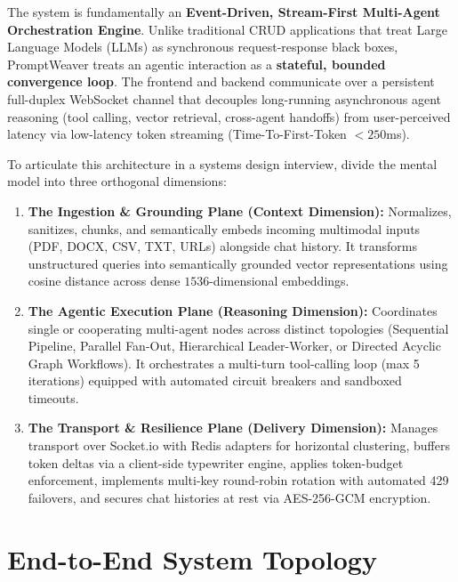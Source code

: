 \documentclass[10pt,a4paper]{article}
\begin{document}
\begin{mentalmodel}
The system is fundamentally an \textbf{Event-Driven, Stream-First Multi-Agent Orchestration Engine}. 
Unlike traditional CRUD applications that treat Large Language Models (LLMs) as synchronous request-response black boxes, PromptWeaver treats an agentic interaction as a \textbf{stateful, bounded convergence loop}. The frontend and backend communicate over a persistent full-duplex WebSocket channel that decouples long-running asynchronous agent reasoning (tool calling, vector retrieval, cross-agent handoffs) from user-perceived latency via low-latency token streaming (Time-To-First-Token $< 250$ms).
\end{mentalmodel}

\noindent To articulate this architecture in a systems design interview, divide the mental model into three orthogonal dimensions:
\begin{enumerate}[leftmargin=*]
    \item \textbf{The Ingestion \& Grounding Plane (Context Dimension):} Normalizes, sanitizes, chunks, and semantically embeds incoming multimodal inputs (PDF, DOCX, CSV, TXT, URLs) alongside chat history. It transforms unstructured queries into semantically grounded vector representations using cosine distance across dense $1536$-dimensional embeddings.
    \item \textbf{The Agentic Execution Plane (Reasoning Dimension):} Coordinates single or cooperating multi-agent nodes across distinct topologies (Sequential Pipeline, Parallel Fan-Out, Hierarchical Leader-Worker, or Directed Acyclic Graph Workflows). It orchestrates a multi-turn tool-calling loop (max 5 iterations) equipped with automated circuit breakers and sandboxed timeouts.
    \item \textbf{The Transport \& Resilience Plane (Delivery Dimension):} Manages transport over Socket.io with Redis adapters for horizontal clustering, buffers token deltas via a client-side typewriter engine, applies token-budget enforcement, implements multi-key round-robin rotation with automated 429 failovers, and secures chat histories at rest via AES-256-GCM encryption.
\end{enumerate}

\section{End-to-End System Topology}
\end{document}
